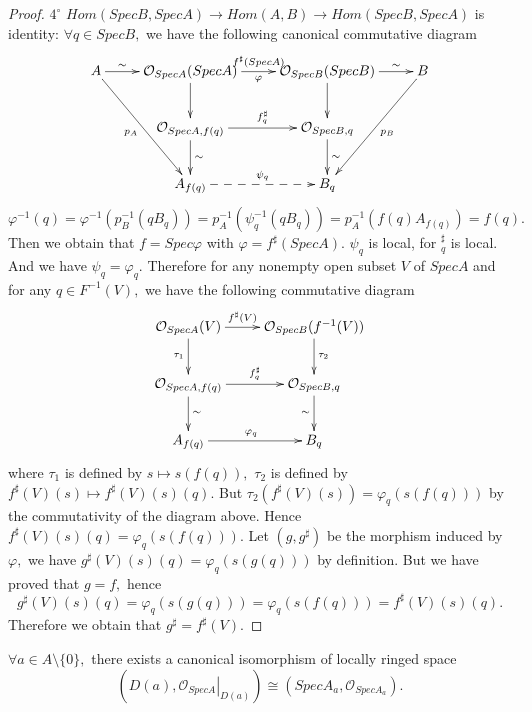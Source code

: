\begin{proof}
$\mathit{4^{\circ}}$ $Hom(SpecB,SpecA)\rightarrow
Hom(A,B)\rightarrow Hom(SpecB,SpecA)$ is identity: $\forall q\in
SpecB,$ we have the following canonical commutative diagram
\[ \xymatrix{
   A \ar[r]^-{\sim} \ar"3,2"_-{p_A} & \mathcal {O}_{SpecA}(SpecA)
   \ar[r]^-{f^{\sharp}(SpecA)}_-{\varphi} \ar[d] & \mathcal {O}_{SpecB}(SpecB)
   \ar[r]^-{\sim} \ar[d] & B \ar"3,3"^-{p_B}                  \\
   & \mathcal {O}_{SpecA,f(q)} \ar[d]^-{\sim} \ar[r]^-{f^{\sharp}_q}
   & \mathcal {O}_{SpecB,q} \ar[d]^-{\sim}                    \\
   & A_{f(q)} \ar@{-->}[r]^-{\psi_q} & B_q }  \]
$\varphi^{-1}(q)=\varphi^{-1}(p_B^{-1}(qB_q))=p_A^{-1}(\psi_q^{-1}(qB_q))=p_A^{-1}(f(q)A_{f(q)})=f(q).$
Then we obtain that $f=Spec\varphi$ with
$\varphi=f^{\sharp}(SpecA)$. $\psi_q$ is local, for $^{\sharp}_q$ is
local. And we have $\psi_q=\varphi_q.$ Therefore for any nonempty
open subset $V$ of $SpecA$ and for any $q\in F^{-1}(V),$ we have the
following commutative diagram
\[ \xymatrix{
   \mathcal {O}_{SpecA}(V) \ar[r]^-{f^{\sharp}(V)} \ar[d]_{\tau_1} & \mathcal
   {O}_{SpecB}(f^{-1}(V)) \ar[d]^{\tau_2}                         \\
   \mathcal {O}_{SpecA,f(q)} \ar[r]^-{f^{\sharp}_q} \ar[d]^{\sim} & \mathcal
   {O}_{SpecB,q} \ar[d]_{\sim}                                    \\
   A_{f(q)} \ar[r]^{\varphi_q} & B_q }  \]
where $\tau_1$ is defined by $s\mapsto s(f(q)),$ $\tau_2$ is defined
by $f^{\sharp}(V)(s)\mapsto f^{\sharp}(V)(s)(q).$ But
$\tau_2(f^{\sharp}(V)(s))=\varphi_q(s(f(q)))$ by the commutativity
of the diagram above. Hence
$f^{\sharp}(V)(s)(q)=\varphi_q(s(f(q))).$ Let $(g,g^{\sharp})$ be
the morphism induced by $\varphi,$ we have
$g^{\sharp}(V)(s)(q)=\varphi_q(s(g(q)))$ by definition. But we have
proved that $g=f,$ hence
$$g^{\sharp}(V)(s)(q)=\varphi_q(s(g(q)))=\varphi_q(s(f(q)))=f^{\sharp}(V)(s)(q).$$
Therefore we obtain that $g^{\sharp}=f^{\sharp}(V).$
\end{proof}
\begin{prop}
$\forall a\in A\setminus\{0\},$ there exists a canonical isomorphism
of locally ringed space
$$(D(a), \left.\mathcal {O}_{SpecA}\right|_{D(a)})\cong(SpecA_a,\mathcal {O}_{SpecA_a}).$$
\end{prop}
